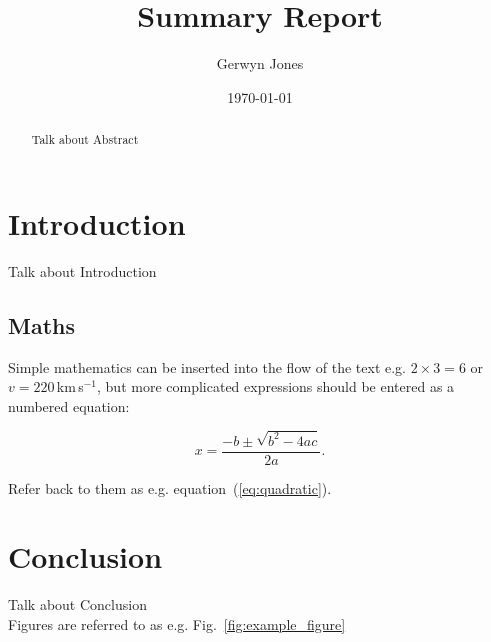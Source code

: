 \documentclass[11pt, a4paper]{article}
\begin{document}
\title{Summary Report}

\author{Gerwyn Jones}

\date{\today}

\maketitle


\begin{abstract}

Talk about Abstract

\end{abstract}




\section{\label{sec:level1} Introduction }

Talk about Introduction

\cite{Bartelli.Motta.2016}

\subsection{Maths}
\label{sec:maths} %

Simple mathematics can be inserted into the flow of the text e.g. $2\times3=6$
or $v=220$\,km\,s$^{-1}$, but more complicated expressions should be entered
as a numbered equation:

\begin{equation}
    x=\frac{-b\pm\sqrt{b^2-4ac}}{2a}.
	\label{eq:quadratic}
\end{equation}

Refer back to them as e.g. equation~(\ref{eq:quadratic}).



\section{\label{sec:level1} Conclusion }

Talk about Conclusion
\\
Figures are referred to as e.g. Fig.~\ref{fig:example_figure}
\end{document}
